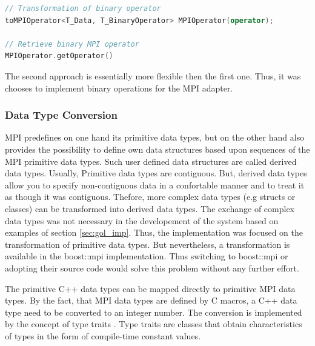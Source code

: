 \begin{lstlisting}[language=C++, caption={ }, label=lst:mpi_bin2]
// Transformation of binary operator
toMPIOperator<T_Data, T_BinaryOperator> MPIOperator(operator);

// Retrieve binary MPI operator
MPIOperator.getOperator()
\end{lstlisting}


The second approach is essentially more flexible then the first
one. Thus, it was chooses to implement binary operations for the
MPI adapter.

\subsubsection{Data Type Conversion}
\label{sec:data_type_conversion}
MPI predefines on one hand its primitive data types, but on the other
hand also provides the possibility to define own data structures based
upon sequences of the MPI primitive data types. Such user defined data
structures are called derived data types. Usually, Primitive data
types are contiguous. But, derived data types allow you to specify
non-contiguous data in a confortable manner and to treat it as though
it was contiguous.  Thefore, more complex data types (e.g structs or
classes) can be transformed into derived data types. The exchange
of complex data types was not necessary in the developement of the
system based on examples of section \ref{sec:gol_imp}. Thus, the
implementation was focused on the transformation of primitive data
types.  But nevertheless, a transformation is available in the
boost::mpi \cite{ref:boost_mpi} implementation. Thus switching to
boost::mpi or adopting their source code would solve this problem
without any further effort.

The primitive C++ data types can be mapped directly to primitive MPI
data types. By the fact, that MPI data types are defined by C macros,
a C++ data type need to be converted to an integer number. The
conversion is implemented by the concept of type traits
\cite{ref:type_trait}.  Type traits are classes that obtain
characteristics of types in the form of compile-time constant values.

